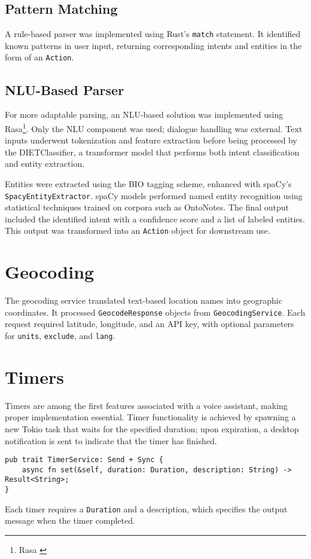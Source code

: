 \subsection{Pattern Matching}
A rule-based parser was implemented using Rust's \texttt{match} statement.
It identified known patterns in user input, returning corresponding intents and entities in the form of an \texttt{Action}.

\subsection{NLU-Based Parser}
For more adaptable parsing, an NLU-based solution was implemented using Rasa\footnote{Rasa \cite{rasa}}.
Only the NLU component was used; dialogue handling was external.
Text inputs underwent tokenization and feature extraction before being processed by the DIETClassifier,
a transformer model that performs both intent classification and entity extraction.

Entities were extracted using the BIO tagging scheme, enhanced with spaCy's \texttt{SpacyEntityExtractor}.
spaCy models performed named entity recognition using statistical techniques trained on corpora such as OntoNotes.
The final output included the identified intent with a confidence score and a list of labeled entities.
This output was transformed into an \texttt{Action} object for downstream use.

\section{Geocoding}
The geocoding service translated text-based location names into geographic coordinates.
It processed \texttt{GeocodeResponse} objects from \texttt{GeocodingService}.
Each request required latitude, longitude, and an API key, with optional parameters for \texttt{units}, \texttt{exclude}, and \texttt{lang}.

\section{Timers}
Timers are among the first features associated with a voice assistant,
making proper implementation essential.
Timer functionality is achieved by spawning a new Tokio task that waits for the specified duration;
upon expiration, a desktop notification is sent to indicate that the timer has finished.

\begin{verbatim}
pub trait TimerService: Send + Sync {
    async fn set(&self, duration: Duration, description: String) -> Result<String>;
}
\end{verbatim}
Each timer requires a \texttt{Duration} and a description,
which specifies the output message when the timer completed.

